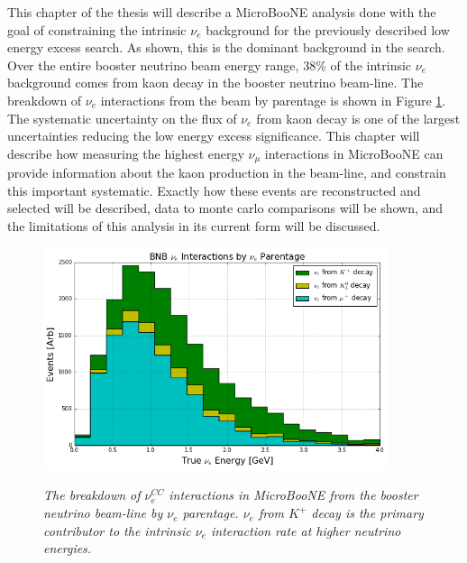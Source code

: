 
This chapter of the thesis will describe a MicroBooNE analysis done with the goal of constraining the intrinsic $\nu_e$ background for the previously described low energy excess search. As shown, this is the dominant background in the search. Over the entire booster neutrino beam energy range, 38\% of the intrinsic $\nu_e$ background comes from kaon decay in the booster neutrino beam-line. The breakdown of $\nu_e$ interactions from the beam by parentage is shown in Figure \ref{BNB_nue_parentage_plot}. The systematic uncertainty on the flux of $\nu_e$ from kaon decay is one of the largest uncertainties reducing the low energy excess significance. This chapter will describe how measuring the highest energy $\nu_\mu$ interactions in MicroBooNE can provide information about the kaon production in the beam-line, and constrain this important systematic. Exactly how these events are reconstructed and selected will be described, data to monte carlo comparisons will be shown, and the limitations of this analysis in its current form will be discussed.

\begin{figure}[ht!]
\centering
	\includegraphics[width=0.9\textwidth]{Figures/BNB_nue_parentage_plot.png} \\
\caption{\textit{The breakdown of $\nu_e^{CC}$ interactions in MicroBooNE from the booster neutrino beam-line by $\nu_e$ parentage. $\nu_e$ from $K^+$ decay is the primary contributor to the intrinsic $\nu_e$ interaction rate at higher neutrino energies.}}\label{BNB_nue_parentage_plot}
\end{figure}

